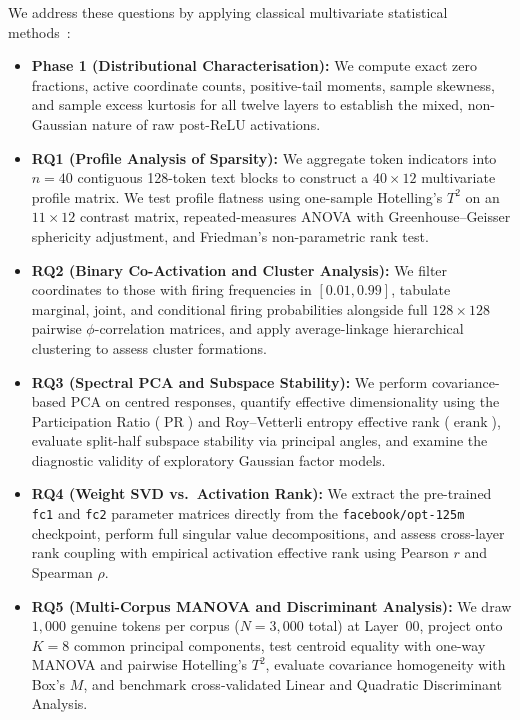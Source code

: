\documentclass[12pt, a4paper, oneside]{report}
\theoremstyle{definition}
\newcommand{\erank}{\operatorname{erank}}
\newcommand{\PR}{\operatorname{PR}}
\begin{document}
We address these questions by applying classical multivariate statistical methods~\cite{anderson2003introduction, johnson2014applied, rao1973linear}:
\begin{itemize}
    \item \textbf{Phase 1 (Distributional Characterisation):} We compute exact zero fractions, active coordinate counts, positive-tail moments, sample skewness, and sample excess kurtosis for all twelve layers to establish the mixed, non-Gaussian nature of raw post-ReLU activations.
    \item \textbf{RQ1 (Profile Analysis of Sparsity):} We aggregate token indicators into $n = 40$ contiguous 128-token text blocks to construct a $40 \times 12$ multivariate profile matrix. We test profile flatness using one-sample Hotelling's $T^2$ on an $11 \times 12$ contrast matrix, repeated-measures ANOVA with Greenhouse--Geisser sphericity adjustment, and Friedman's non-parametric rank test.
    \item \textbf{RQ2 (Binary Co-Activation and Cluster Analysis):} We filter coordinates to those with firing frequencies in $[0.01, 0.99]$, tabulate marginal, joint, and conditional firing probabilities alongside full $128 \times 128$ pairwise $\phi$-correlation matrices, and apply average-linkage hierarchical clustering to assess cluster formations.
    \item \textbf{RQ3 (Spectral PCA and Subspace Stability):} We perform covariance-based PCA on centred responses, quantify effective dimensionality using the Participation Ratio ($\PR$) and Roy--Vetterli entropy effective rank ($\erank$), evaluate split-half subspace stability via principal angles, and examine the diagnostic validity of exploratory Gaussian factor models.
    \item \textbf{RQ4 (Weight SVD vs.\ Activation Rank):} We extract the pre-trained \texttt{fc1} and \texttt{fc2} parameter matrices directly from the \texttt{facebook/opt-125m} checkpoint, perform full singular value decompositions, and assess cross-layer rank coupling with empirical activation effective rank using Pearson $r$ and Spearman $\rho$.
    \item \textbf{RQ5 (Multi-Corpus MANOVA and Discriminant Analysis):} We draw $1{,}000$ genuine tokens per corpus ($N = 3{,}000$ total) at Layer~00, project onto $K = 8$ common principal components, test centroid equality with one-way MANOVA and pairwise Hotelling's $T^2$, evaluate covariance homogeneity with Box's $M$, and benchmark cross-validated Linear and Quadratic Discriminant Analysis.
\end{itemize}
\end{document}
